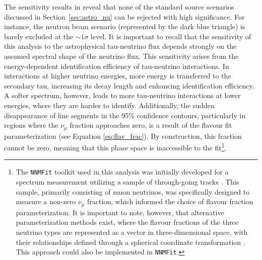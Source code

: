 The sensitivity results in  reveal that none of the standard source scenarios discussed in Section~\ref{sec:astro_nu} can be rejected with high significance. For instance, the neutron beam scenario (represented by the dark blue triangle) is barely excluded at the $\sim1\sigma$ level. It is important to recall that the sensitivity of this analysis to the astrophysical tau-neutrino flux depends strongly on the assumed spectral shape of the neutrino flux. This sensitivity arises from the energy-dependent identification efficiency of tau-neutrino interactions. In interactions at higher neutrino energies, more energy is transferred to the secondary tau, increasing its decay length and enhancing identification efficiency. A softer spectrum, however, leads to more tau-neutrino interactions at lower energies, where they are harder to identify. Additionally, the sudden disappearance of line segments in the 95\% confidence contours, particularly in regions where the $\nu_\mu$ fraction approaches zero, is a result of the flavour fit parameterization (see Equation \ref{eq:flav_frac}). By construction, this fraction cannot be zero, meaning that this phase space is inaccessible to the fit\footnote{The \texttt{NNMFit} toolkit used in this analysis was initially developed for a spectrum measurement utilizing a sample of through-going tracks \cite{diffusenumu}. This sample, primarily consisting of muon neutrinos, was specifically designed to measure a non-zero \(\nu_{\mu}\) fraction, which informed the choice of flavour fraction parameterization. It is important to note, however, that alternative parameterization methods exist, where the flavour fractions of the three neutrino types are represented as a vector in three-dimensional space, with their relationships defined through a spherical coordinate transformation \cite{golemflavor}. This approach could also be implemented in \texttt{NNMFit}.}.

